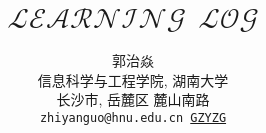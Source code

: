 \documentclass{article}
\title{$\mathcal{LEARNING\ \ LOG}$}
\author{
  郭治焱 \\
  信息科学与工程学院, 湖南大学\\
  长沙市, 岳麓区 麓山南路 \\
  \texttt{zhiyanguo@hnu.edu.cn \hspace{12pt} \href{https://github.com/GZYZG/}{\faGithub GZYZG}}
}
\begin{document}
\maketitle





\vspace{\baselineskip}
\vspace{\baselineskip}
\vspace{\baselineskip}






% 

% 


% 


% 
\end{document}
